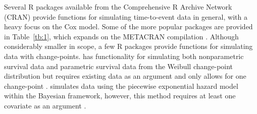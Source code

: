 Several R packages available from the Comprehensive R Archive Network (CRAN) provide functions for simulating time-to-event data in general, with a heavy focus on the Cox model. Some of the more popular packages are provided in Table~\ref{tb:1}, which expands on the METACRAN compilation \citep{metacran}. Although considerably smaller in scope, a few R packages provide functions for simulating data with change-points.  has functionality for simulating both nonparametric survival data and parametric survival data from the Weibull change-point distribution but requires existing data as an argument and only allows for one change-point \citep{CPsurv}.  simulates data using the piecewise exponential hazard model within the Bayesian framework, however, this method requires at least one covariate as an argument \citep{SimSCRPiecewise}.


